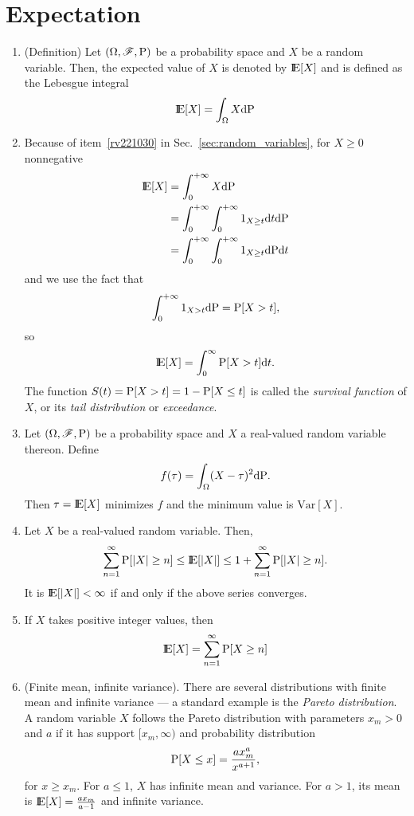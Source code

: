 \documentclass[a4paper,10pt]{article}
\begin{document}
\section{Expectation}
\begin{enumerate}  
\item (Definition)
 Let $(\Omega,\mathscr{F},\mathrm{P})$ be a probability space and $X$ be a random variable. Then, the expected value of 
 $X$ is denoted by $\E[X]$ and is defined as the Lebesgue integral
 \[
  \E[X] = \int_{\Omega} X\d \prob
 \]

\item 
 \label{gx1312}
 Because of item~\ref{rv221030} in Sec.~\ref{sec:random_variables}, for $X\geq 0$ nonnegative 
 \begin{align*}
  \E[X] &= \int_{0}^{+\infty} X \d \prob\\
        &= \int_{0}^{+\infty} \int_0^{+\infty} 1_{X\geq t}\d t \d \prob\\
        &= \int_{0}^{+\infty} \int_0^{+\infty} 1_{X\geq t} \d \prob \d t
 \end{align*}
 and we use the fact that 
 \[
  \int_{0}^{+\infty} 1_{X>t}\mathrm{d} \mathrm{P} = \mathrm{P}[X>t],
 \]
 so
 \[
  \E[X] = \int_0^\infty \prob[X>t]\d t.
 \]
 The function $S(t) = \mathrm{P}[X>t] = 1-\mathrm{P}[X\leq t]$ is called the \textit{survival function} 
 of $X$, or its \textit{tail distribution} or \textit{exceedance}.

 \item Let $(\Omega,\mathscr{F},\mathrm{P})$ be a probability space and $X$ a real-valued random variable thereon. Define 
 \[
  f(\tau) = \int_{\Omega}(X-\tau)^2\mathrm{d}\mathrm{P}.
 \]
 Then $\tau = \E[X]$ minimizes $f$ and the minimum value is $\mathrm{Var}[X]$.
 \item Let $X$ be a real-valued random variable. Then,
 \[
  \sum_{n=1}^{\infty}\prob[|X|\geq n] \leq \E[|X|] \leq 1+ \sum_{n=1}^{\infty}\prob[|X|\geq n].
 \]
 It is $\E[|X|]<\infty$ if and only if the above series converges.
 \item If $X$ takes positive integer values, then
 \[
  \E[X] = \sum_{n=1}^{\infty}\prob[X\geq n]
 \]

 \item (Finite mean, infinite variance). There are several distributions with finite mean 
       and infinite variance --- a standard example is the \textit{Pareto distribution}.
       A random variable $X$ follows the Pareto distribution with parameters $x_m>0$ and $a$
       if it has support $[x_m,\infty)$ and probability distribution
       \[
        \mathrm{P}[X\leq x] = \frac{ax_m^a}{x^{a+1}},
       \]
       for $x\geq x_m$. For $a\leq 1$, $X$ has infinite mean and variance. For $a>1$, its
       mean is $\E[X]=\frac{ax_m}{a-1}$ and infinite variance.
       

\end{enumerate}
\end{document}
